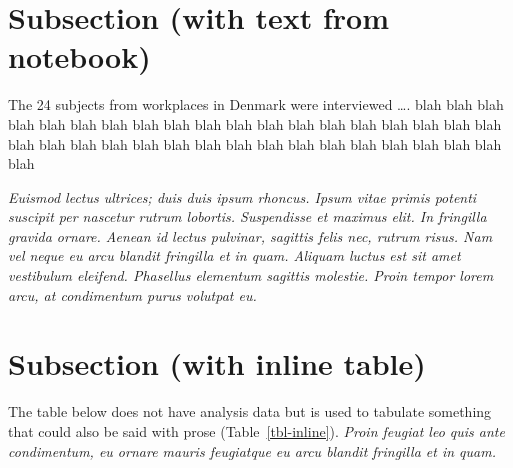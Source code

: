 \documentclass[
  10pt,
  a4paper,
]{scrbook}
\let\oldemph\emph
\renewcommand\emph[1]{\oldemph{\color{gray}#1}} %
\begin{document}
\section{Subsection (with text from
notebook)}\label{subsection-with-text-from-notebook}

\protect{}\label{doc-sampling}
The 24 subjects from workplaces in Denmark were interviewed \ldots. blah
blah blah blah blah blah blah blah blah blah blah blah blah blah blah
blah blah blah blah blah blah blah blah blah blah blah blah blah blah
blah blah blah blah blah blah blah

\emph{Euismod lectus ultrices; duis duis ipsum rhoncus. Ipsum vitae
primis potenti suscipit per nascetur rutrum lobortis. Suspendisse et
maximus elit. In fringilla gravida ornare. Aenean id lectus pulvinar,
sagittis felis nec, rutrum risus. Nam vel neque eu arcu blandit
fringilla et in quam. Aliquam luctus est sit amet vestibulum eleifend.
Phasellus elementum sagittis molestie. Proin tempor lorem arcu, at
condimentum purus volutpat eu.}

\section{Subsection (with inline
table)}\label{subsection-with-inline-table}

The table below does not have analysis data but is used to tabulate
something that could also be said with prose (Table~\ref{tbl-inline}).
\emph{Proin feugiat leo quis ante condimentum, eu ornare mauris
feugiatque eu arcu blandit fringilla et in quam.}
\end{document}
